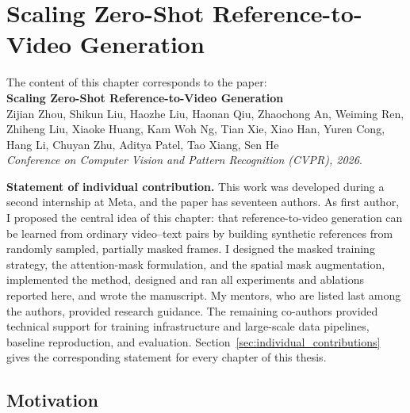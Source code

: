 \chapter{Scaling Zero-Shot Reference-to-Video Generation}

\begin{tcolorbox}[
    breakable,
    colback=gray!5,
    colframe=black,
]
The content of this chapter corresponds to the paper: \\
\noindent \textbf{Scaling Zero-Shot Reference-to-Video Generation} \\
\noindent Zijian Zhou, Shikun Liu, Haozhe Liu, Haonan Qiu, Zhaochong An, Weiming Ren, Zhiheng Liu, Xiaoke Huang, Kam Woh Ng, Tian Xie, Xiao Han, Yuren Cong, Hang Li, Chuyan Zhu, Aditya Patel, Tao Xiang, Sen He \\
\noindent \textit{Conference on Computer Vision and Pattern Recognition (CVPR), 2026}.

\vspace{0.6em}
\noindent \textbf{Statement of individual contribution.}
This work was developed during a second internship at Meta, and the paper has seventeen authors. As first author, I proposed the central idea of this chapter: that reference-to-video generation can be learned from ordinary video--text pairs by building synthetic references from randomly sampled, partially masked frames. I designed the masked training strategy, the attention-mask formulation, and the spatial mask augmentation, implemented the method, designed and ran all experiments and ablations reported here, and wrote the manuscript. My mentors, who are listed last among the authors, provided research guidance. The remaining co-authors provided technical support for training infrastructure and large-scale data pipelines, baseline reproduction, and evaluation. Section~\ref{sec:individual_contributions} gives the corresponding statement for every chapter of this thesis.
\end{tcolorbox}

\section{Motivation}






